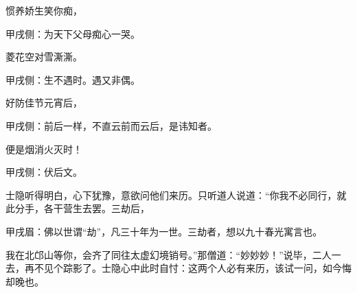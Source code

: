 \begin{poem}
    \begin{pl}惯养娇生笑你痴，\end{pl}\begin{note}甲戌侧：为天下父母痴心一哭。\end{note}

    \begin{pl}菱花空对雪澌澌。\end{pl}\begin{note}甲戌侧：生不遇时。遇又非偶。\end{note}

    \begin{pl}好防佳节元宵后，\end{pl}\begin{note}甲戌侧：前后一样，不直云前而云后，是讳知者。\end{note}

    \begin{pl}便是烟消火灭时！\end{pl}\begin{note}甲戌侧：伏后文。\end{note}
\end{poem}


\begin{parag}
    士隐听得明白，心下犹豫，意欲问他们来历。只听道人说道：“你我不必同行，就此分手，各干营生去罢。三劫后，\begin{note}甲戌眉：佛以世谓“劫”，凡三十年为一世。三劫者，想以九十春光寓言也。\end{note}我在北邙山等你，会齐了同往太虚幻境销号。”那僧道：“妙妙妙！”说毕，二人一去，再不见个踪影了。士隐心中此时自忖：这两个人必有来历，该试一问，如今悔却晚也。
\end{parag}


